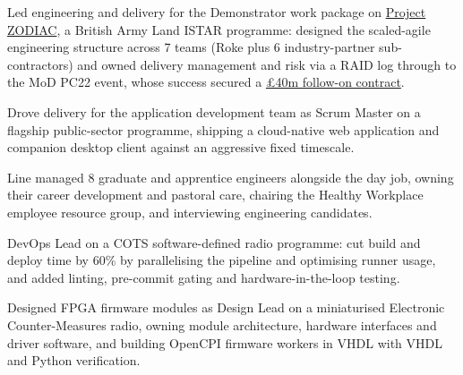 \else%
\begin{tightemize}
  \item Led engineering and delivery for the Demonstrator work package on \href{https://www.roke.co.uk/project-zodiac/}{Project ZODIAC}, a British Army Land ISTAR programme: designed the scaled-agile engineering structure across 7 teams (Roke plus 6 industry-partner sub-contractors) and owned delivery management and risk via a RAID log through to the MoD PC22 event, whose success secured a \href{https://www.linkedin.com/posts/roke-manor-research_roke-weareroke-activity-7108015849168347139-bJ8Z/}{\pounds{}40m follow-on contract}. %
  \item Drove delivery for the application development team as Scrum Master on a flagship public-sector programme, shipping a cloud-native web application and companion desktop client against an aggressive fixed timescale.
  \item Line managed 8 graduate and apprentice engineers alongside the day job, owning their career development and pastoral care, chairing the Healthy Workplace employee resource group, and interviewing engineering candidates.
  \item DevOps Lead on a COTS software-defined radio programme: cut build and deploy time by 60\% by parallelising the pipeline and optimising runner usage, and added linting, pre-commit gating and hardware-in-the-loop testing.
  \item Designed FPGA firmware modules as Design Lead on a miniaturised Electronic Counter-Measures radio, owning module architecture, hardware interfaces and driver software, and building OpenCPI firmware workers in VHDL with VHDL and Python verification.
\end{tightemize}
\fi
\sectionsep{}
\vfill{}
